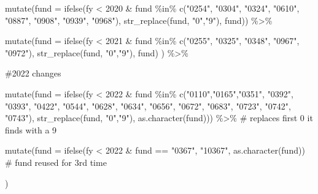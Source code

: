\documentclass[
  letterpaper,
  DIV=11,
  numbers=noendperiod]{scrreport}
\newenvironment{Shaded}{\begin{snugshade}}{\end{snugshade}}
\newcommand{\AttributeTok}[1]{\textcolor[rgb]{0.40,0.45,0.13}{#1}}
\newcommand{\CommentTok}[1]{\textcolor[rgb]{0.37,0.37,0.37}{#1}}
\newcommand{\DecValTok}[1]{\textcolor[rgb]{0.68,0.00,0.00}{#1}}
\newcommand{\FunctionTok}[1]{\textcolor[rgb]{0.28,0.35,0.67}{#1}}
\newcommand{\NormalTok}[1]{\textcolor[rgb]{0.00,0.23,0.31}{#1}}
\newcommand{\SpecialCharTok}[1]{\textcolor[rgb]{0.37,0.37,0.37}{#1}}
\newcommand{\StringTok}[1]{\textcolor[rgb]{0.13,0.47,0.30}{#1}}
\begin{document}
\begin{Shaded}
\begin{Highlighting}[]
  \FunctionTok{mutate}\NormalTok{(}\AttributeTok{fund =}  \FunctionTok{ifelse}\NormalTok{(fy }\SpecialCharTok{\textless{}} \DecValTok{2020} \SpecialCharTok{\&}\NormalTok{ fund }\SpecialCharTok{\%in\%} \FunctionTok{c}\NormalTok{(}\StringTok{"0254"}\NormalTok{, }\StringTok{"0304"}\NormalTok{, }\StringTok{"0324"}\NormalTok{, }\StringTok{"0610"}\NormalTok{, }\StringTok{"0887"}\NormalTok{, }\StringTok{"0908"}\NormalTok{, }\StringTok{"0939"}\NormalTok{, }\StringTok{"0968"}\NormalTok{), }\FunctionTok{str\_replace}\NormalTok{(fund, }\StringTok{"0"}\NormalTok{,}\StringTok{"9"}\NormalTok{), fund)) }\SpecialCharTok{\%\textgreater{}\%}

  \FunctionTok{mutate}\NormalTok{(}\AttributeTok{fund =}  \FunctionTok{ifelse}\NormalTok{(fy }\SpecialCharTok{\textless{}} \DecValTok{2021} \SpecialCharTok{\&}\NormalTok{ fund }\SpecialCharTok{\%in\%} \FunctionTok{c}\NormalTok{(}\StringTok{"0255"}\NormalTok{, }\StringTok{"0325"}\NormalTok{, }\StringTok{"0348"}\NormalTok{, }\StringTok{"0967"}\NormalTok{, }\StringTok{"0972"}\NormalTok{), }\FunctionTok{str\_replace}\NormalTok{(fund, }\StringTok{"0"}\NormalTok{,}\StringTok{"9"}\NormalTok{), fund) ) }\SpecialCharTok{\%\textgreater{}\%}
  
   \CommentTok{\#2022 changes}

  \FunctionTok{mutate}\NormalTok{(}\AttributeTok{fund =} \FunctionTok{ifelse}\NormalTok{(fy }\SpecialCharTok{\textless{}} \DecValTok{2022} \SpecialCharTok{\&}\NormalTok{ fund }\SpecialCharTok{\%in\%} \FunctionTok{c}\NormalTok{(}\StringTok{"0110"}\NormalTok{,}\StringTok{"0165"}\NormalTok{,}\StringTok{"0351"}\NormalTok{, }\StringTok{"0392"}\NormalTok{, }\StringTok{"0393"}\NormalTok{, }\StringTok{"0422"}\NormalTok{, }\StringTok{"0544"}\NormalTok{, }\StringTok{"0628"}\NormalTok{, }\StringTok{"0634"}\NormalTok{,  }\StringTok{"0656"}\NormalTok{, }\StringTok{"0672"}\NormalTok{, }\StringTok{"0683"}\NormalTok{, }\StringTok{"0723"}\NormalTok{, }\StringTok{"0742"}\NormalTok{, }\StringTok{"0743"}\NormalTok{), }\FunctionTok{str\_replace}\NormalTok{(fund, }\StringTok{"0"}\NormalTok{,}\StringTok{"9"}\NormalTok{), }\FunctionTok{as.character}\NormalTok{(fund))) }\SpecialCharTok{\%\textgreater{}\%}  \CommentTok{\# replaces first 0 it finds with a 9}

  \FunctionTok{mutate}\NormalTok{(}\AttributeTok{fund =} \FunctionTok{ifelse}\NormalTok{(fy }\SpecialCharTok{\textless{}} \DecValTok{2022} \SpecialCharTok{\&}\NormalTok{ fund }\SpecialCharTok{==} \StringTok{"0367"}\NormalTok{, }\StringTok{"10367"}\NormalTok{, }\FunctionTok{as.character}\NormalTok{(fund)) }\CommentTok{\# fund reused for 3rd time}

\NormalTok{)}
\end{Highlighting}
\end{Shaded}
\end{document}
